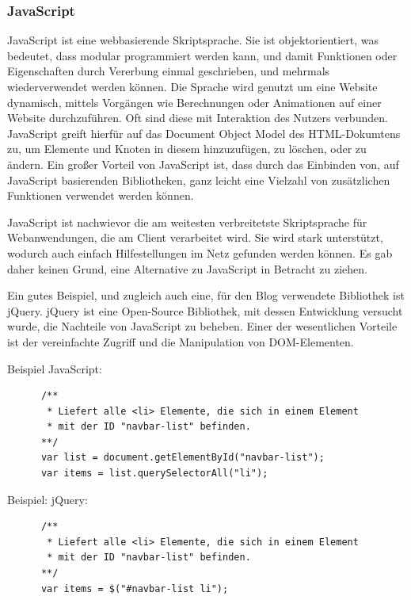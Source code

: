       \subsubsection*{JavaScript}
      {JavaScript\cite{javascript}} ist eine webbasierende Skriptsprache. Sie ist objektorientiert, was bedeutet, dass modular programmiert werden kann, und damit Funktionen oder Eigenschaften
      durch Vererbung einmal geschrieben, und mehrmals wiederverwendet werden können. Die Sprache wird genutzt um eine Website dynamisch, mittels Vorgängen wie Berechnungen oder Animationen auf einer Website durchzuführen.
      Oft sind diese mit Interaktion des Nutzers verbunden. JavaScript greift hierfür auf das Document Object Model des HTML-Dokumtens zu, um Elemente und Knoten in diesem hinzuzufügen, zu löschen, oder
      zu ändern. Ein großer Vorteil von JavaScript ist, dass durch das Einbinden von, auf JavaScript basierenden Bibliotheken, ganz leicht eine Vielzahl von zusätzlichen Funktionen
      verwendet werden können.

      JavaScript ist nachwievor die am weitesten verbreitetste Skriptsprache für Webanwendungen, die am Client verarbeitet wird. Sie wird stark unterstützt, wodurch auch einfach Hilfestellungen im Netz
      gefunden werden können. Es gab daher keinen Grund, eine Alternative zu JavaScript in Betracht zu ziehen.

      Ein gutes Beispiel, und zugleich auch eine, für den Blog verwendete Bibliothek ist {jQuery\cite{jquery}}.
      jQuery ist eine Open-Source Bibliothek, mit dessen Entwicklung versucht wurde, die Nachteile von JavaScript zu beheben. Einer der wesentlichen Vorteile ist
      der vereinfachte Zugriff und die Manipulation von DOM-Elementen.

      Beispiel JavaScript:

      \lstset{language=html}
    	\begin{lstlisting}
      /**
       * Liefert alle <li> Elemente, die sich in einem Element
       * mit der ID "navbar-list" befinden.
      **/
      var list = document.getElementById("navbar-list");
      var items = list.querySelectorAll("li");
      \end{lstlisting}

      Beispiel: jQuery:

      \lstset{language=html}
    	\begin{lstlisting}
      /**
       * Liefert alle <li> Elemente, die sich in einem Element
       * mit der ID "navbar-list" befinden.
      **/
      var items = $("#navbar-list li");
    	\end{lstlisting}


